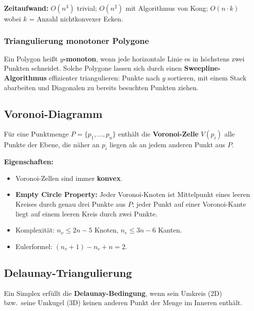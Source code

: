 \documentclass[12pt, a4paper]{article}
\begin{document}
\textbf{Zeitaufwand:} $O(n^3)$ trivial; $O(n^2)$ mit Algorithmus von Kong; $O(n \cdot k)$ wobei $k$ = Anzahl nichtkonvexer Ecken.

\subsubsection*{Triangulierung monotoner Polygone}

Ein Polygon heißt \textbf{$y$-monoton}, wenn jede horizontale Linie es in höchstens zwei Punkten schneidet. Solche Polygone lassen sich durch einen \textbf{Sweepline-Algorithmus} effizienter triangulieren: Punkte nach $y$ sortieren, mit einem Stack abarbeiten und Diagonalen zu bereits besuchten Punkten ziehen.

\subsection{Voronoi-Diagramm}

Für eine Punktmenge $P = \{p_1, \dots, p_n\}$ enthält die \textbf{Voronoi-Zelle} $V(p_i)$ alle Punkte der Ebene, die näher an $p_i$ liegen als an jedem anderen Punkt aus $P$.

\textbf{Eigenschaften:}
\begin{itemize}
  \item Voronoi-Zellen sind immer \textbf{konvex}.
  \item \textbf{Empty Circle Property:} Jeder Voronoi-Knoten ist Mittelpunkt eines leeren Kreises durch genau drei Punkte aus $P$; jeder Punkt auf einer Voronoi-Kante liegt auf einem leeren Kreis durch zwei Punkte.
  \item Komplexität: $n_v \leq 2n-5$ Knoten, $n_e \leq 3n-6$ Kanten.
  \item Eulerformel: $(n_v + 1) - n_e + n = 2$.
\end{itemize}

\subsection{Delaunay-Triangulierung}

Ein Simplex erfüllt die \textbf{Delaunay-Bedingung}, wenn sein Umkreis (2D) bzw.\ seine Umkugel (3D) keinen anderen Punkt der Menge im Inneren enthält.
\end{document}
